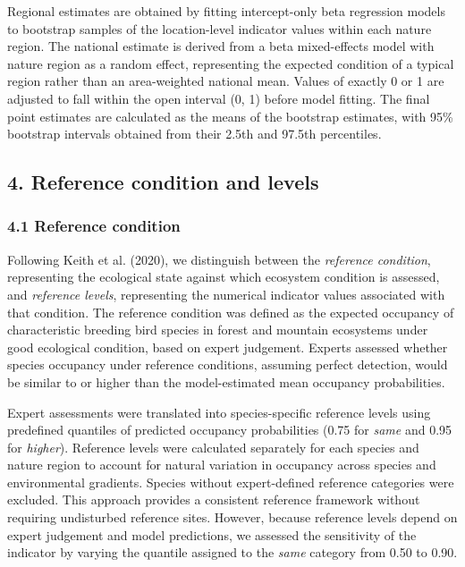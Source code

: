 \documentclass[
  letterpaper,
  DIV=11,
  numbers=noendperiod]{scrartcl}
\begin{document}
Regional estimates are obtained by fitting intercept-only beta
regression models to bootstrap samples of the location-level indicator
values within each nature region. The national estimate is derived from
a beta mixed-effects model with nature region as a random effect,
representing the expected condition of a typical region rather than an
area-weighted national mean. Values of exactly 0 or 1 are adjusted to
fall within the open interval (0, 1) before model fitting. The final
point estimates are calculated as the means of the bootstrap estimates,
with 95\% bootstrap intervals obtained from their 2.5th and 97.5th
percentiles.

\subsection{4. Reference condition and
levels}\label{reference-condition-and-levels}

\subsubsection{4.1 Reference condition}\label{reference-condition}

Following Keith et al. (2020), we distinguish between the
\emph{reference condition}, representing the ecological state against
which ecosystem condition is assessed, and \emph{reference levels},
representing the numerical indicator values associated with that
condition. The reference condition was defined as the expected occupancy
of characteristic breeding bird species in forest and mountain
ecosystems under good ecological condition, based on expert judgement.
Experts assessed whether species occupancy under reference conditions,
assuming perfect detection, would be similar to or higher than the
model-estimated mean occupancy probabilities.

Expert assessments were translated into species-specific reference
levels using predefined quantiles of predicted occupancy probabilities
(0.75 for \emph{same} and 0.95 for \emph{higher}). Reference levels were
calculated separately for each species and nature region to account for
natural variation in occupancy across species and environmental
gradients. Species without expert-defined reference categories were
excluded. This approach provides a consistent reference framework
without requiring undisturbed reference sites. However, because
reference levels depend on expert judgement and model predictions, we
assessed the sensitivity of the indicator by varying the quantile
assigned to the \emph{same} category from 0.50 to 0.90.
\end{document}
